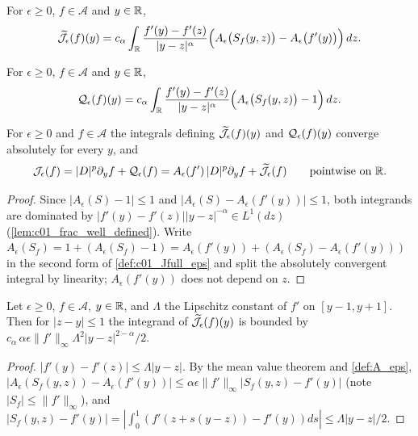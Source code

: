 \begin{definition}
  \label{def:J_eps}
  For $\epsilon\ge0$, $f\in\mathcal A$ and $y\in\mathbb{R}$,
  \[
    \widetilde{\mathcal{J}}_\epsilon(f)(y)=c_\alpha\int_{\mathbb{R}}\frac{f'(y)-f'(z)}{|y-z|^\alpha}
    \Bigl(A_\epsilon\bigl(S_f(y,z)\bigr)-A_\epsilon\bigl(f'(y)\bigr)\Bigr)\,dz .
  \]
\end{definition}

\begin{definition}
  \label{def:c01_Q_eps}
  For $\epsilon\ge0$, $f\in\mathcal A$ and $y\in\mathbb{R}$,
  \[
    \mathcal{Q}_\epsilon(f)(y)=c_\alpha\int_{\mathbb{R}}\frac{f'(y)-f'(z)}{|y-z|^\alpha}
    \Bigl(A_\epsilon\bigl(S_f(y,z)\bigr)-1\Bigr)\,dz .
  \]
\end{definition}

\begin{lemma}
  \label{lem:c01_J_decomposition}
  For $\epsilon\ge0$ and $f\in\mathcal A$ the integrals defining $\widetilde{\mathcal{J}}_\epsilon(f)(y)$ and
  $\mathcal{Q}_\epsilon(f)(y)$ converge absolutely for every $y$, and
  \[
    \mathcal{J}_\epsilon(f)=|D|^{p}\partial_yf+\mathcal{Q}_\epsilon(f)
    =A_\epsilon(f')\,|D|^p\partial_yf+\widetilde{\mathcal{J}}_\epsilon(f)\qquad\text{pointwise on }\mathbb{R} .
  \]
\end{lemma}
\begin{proof}
  Since $|A_\epsilon(S)-1|\le1$ and $|A_\epsilon(S)-A_\epsilon(f'(y))|\le1$, both integrands are
  dominated by $|f'(y)-f'(z)||y-z|^{-\alpha}\in L^1(dz)$ (\cref{lem:c01_frac_well_defined}).
  Write $A_\epsilon(S_f)=1+(A_\epsilon(S_f)-1)=A_\epsilon(f'(y))+(A_\epsilon(S_f)-A_\epsilon(f'(y)))$ in the
  second form of \cref{def:c01_Jfull_eps} and split the absolutely convergent integral by
  linearity; $A_\epsilon(f'(y))$ does not depend on $z$.
\end{proof}

\begin{lemma}
  \label{lem:c01_Jtilde_vanishing}
  Let $\epsilon\ge0$, $f\in\mathcal A$, $y\in\mathbb{R}$, and $\Lambda$ the Lipschitz constant of $f'$ on
  $[y-1,y+1]$.  Then for $|z-y|\le1$ the integrand of $\widetilde{\mathcal{J}}_\epsilon(f)(y)$ is bounded by
  $c_\alpha\,\alpha\epsilon\|f'\|_\infty\Lambda^2|y-z|^{2-\alpha}/2$.
\end{lemma}
\begin{proof}
  $|f'(y)-f'(z)|\le\Lambda|y-z|$.  By the mean value theorem and \cref{def:A_eps},
  $|A_\epsilon(S_f(y,z))-A_\epsilon(f'(y))|\le\alpha\epsilon\|f'\|_\infty|S_f(y,z)-f'(y)|$ (note
  $|S_f|\le\|f'\|_\infty$), and $|S_f(y,z)-f'(y)|=|\int_0^1(f'(z+s(y-z))-f'(y))ds|\le\Lambda|y-z|/2$.
\end{proof}

